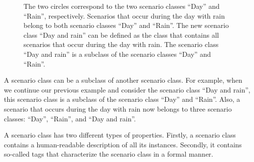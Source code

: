 \setlength{\venncircle}{7em}
\begin{figure}
	\centering
	\caption{The two circles correspond to the two scenario classes ``Day'' and ``Rain'', respectively. Scenarios that occur during the day with rain belong to both scenario classes ``Day'' and ``Rain''. The new scenario class ``Day and rain'' can be defined as the class that contains all scenarios that occur during the day with rain. The scenario class ``Day and rain'' is a subclass of the scenario classes ``Day'' and ``Rain''.}
	\label{fig:venn diagram scenario class}
\end{figure}

A scenario class can be a subclass of another scenario class. For example, when we continue our previous example and consider the scenario class ``Day and rain'', this scenario class is a subclass of the scenario class ``Day'' and ``Rain''. Also, a scenario that occurs during the day with rain now belongs to three scenario classes: ``Day'', ``Rain'', and ``Day and rain''.

A scenario class has two different types of properties. Firstly, a scenario class contains a human-readable description of all its instances. Secondly, it contains so-called tags that characterize the scenario class in a formal manner. 

\cbend
